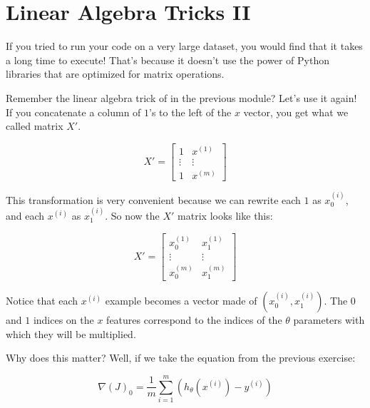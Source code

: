 
\section*{Linear Algebra Tricks II}

If you tried to run your code on a very large dataset, you would find that it takes a long time to execute!
That's because it doesn't use the power of Python libraries that are optimized for matrix operations.


Remember the linear algebra trick of in the previous module? Let's use it again!  
If you concatenate a column of $1$'s to the left of the $x$ vector, you get what we called matrix $X'$.   

$$
X' = \begin{bmatrix} 1 & x^{(1)} \\ \vdots & \vdots \\ 1 & x^{(m)}\end{bmatrix}
$$

This transformation is very convenient because we can rewrite each $1$ as $x_0^{(i)}$, and each $x^{(i)}$ as $x_1^{(i)}$.
So now the $X'$ matrix looks like this:

$$
X' = \begin{bmatrix} x_0^{(1)} & x_1^{(1)} \\ \vdots & \vdots \\ x_0^{(m)} & x_1^{(m)}\end{bmatrix}
$$

Notice that each $x^{(i)}$ example becomes a vector made of $(x^{(i)}_0, x^{(i)}_1)$.  
The $0$ and $1$ indices on the $x$ features correspond to the indices of the $\theta$ parameters with which they will be multiplied.


Why does this matter?
Well, if we take the equation from the previous exercise:

$$
\nabla(J)_0 = \frac{1}{m}\sum_{i=1}^{m}(h_{\theta}(x^{(i)}) - y^{(i)})
$$

